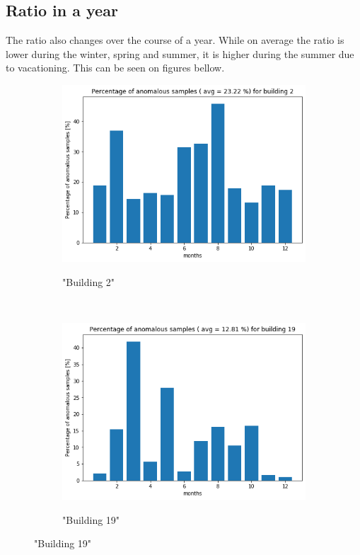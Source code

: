 \subsection{Ratio in a year}

The ratio also changes over the course of a year. While on average the ratio is lower during the winter, spring and summer, it is higher during the summer due to vacationing. 
This can be seen on figures bellow. 

\begin{figure}[H]
	\begin{subfigure}{.5\textwidth}
		\caption{"Building 2"}
		\includegraphics[width=1\linewidth]{../Figures/EC/b2year.png}
		\label{fig:ec_b2year}
	\end{subfigure}%
	~ 
	\begin{subfigure}{.5\textwidth}
		\caption{"Building 19"}
		\includegraphics[width=1\linewidth]{../Figures/EC/b19year.png}
		\label{fig:ec_b5year}
	\end{subfigure}%
    \bigskip


\end{figure}
